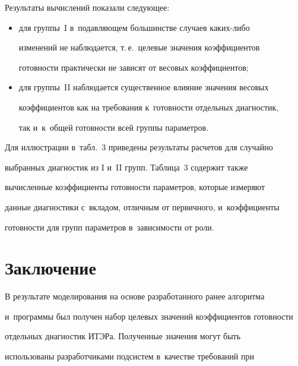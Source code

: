 Результаты вычислений показали сле\-ду\-ющее: 


\begin{itemize}


\item для группы~I в~подавляющем большинстве случаев ка\-ких-ли\-бо 


изменений не наблюдается, т.\,е.\ целевые значения коэффициентов 


готовности практически не зависят от весовых коэффициентов; 


\item для группы~II наблюдается существенное влияние значения весовых 


коэффициентов как на требования к~го\-тов\-ности отдельных диагностик, 


так и~к~общей го\-тов\-ности всей группы па\-ра\-мет\-ров. 


\end{itemize}





Для иллюстрации в~табл.~3 приведены результаты расчетов для случайно 


выбранных диагностик из I и~II групп. Таблица~3 содержит также 


вы\-чис\-лен\-ные коэффициенты готовности параметров, которые измеряют 


данные диагностики с~вкладом, отличным от первичного, и~коэффициенты 


го\-тов\-ности для групп па\-ра\-мет\-ров в~за\-ви\-си\-мости от роли.











\section{Заключение}





В результате моделирования на основе разработанного ранее алгоритма 


и~программы был получен набор целевых значений коэффициентов го\-тов\-ности 


отдельных диагностик ИТЭРа. Полученные значения могут быть 


использованы разработчиками под\-сис\-тем в~качестве требований при 


